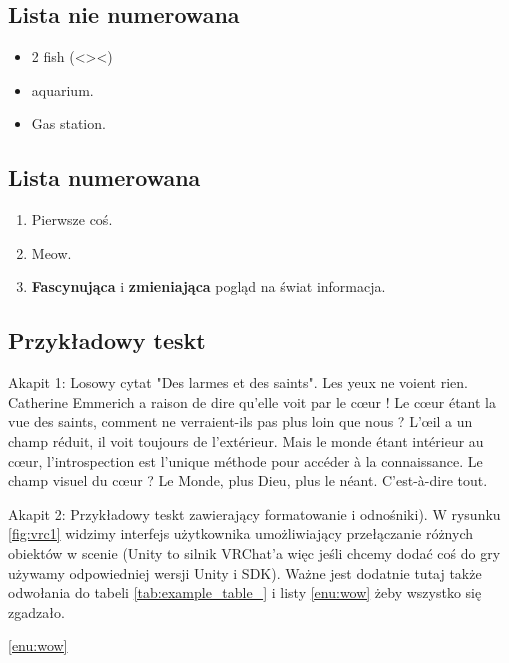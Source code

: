 
\subsection{Lista nie numerowana}
\begin{itemize}
    \item 2 fish (<><)
    \item aquarium.
    \item Gas station.
\end{itemize}
\subsection{Lista numerowana}
\begin{enumerate}
    \item Pierwsze coś.
    \item Meow.
    \item \textbf{Fascynująca} i \textbf{zmieniająca} pogląd na świat informacja. \label{enu:wow}
\end{enumerate}


\subsection*{ Przykładowy teskt }
\begingroup
\raggedright 
Akapit 1: Losowy cytat "Des larmes et des saints".
Les yeux ne voient rien. Catherine Emmerich a raison de dire qu’elle voit
par le cœur ! Le cœur étant la vue des saints, comment ne verraient-ils pas
plus loin que nous ? L’œil a un champ réduit, il voit toujours de l’extérieur.
Mais le monde étant intérieur au cœur, l’introspection est l’unique méthode
pour accéder à la connaissance. Le champ visuel du cœur ? Le Monde, plus
Dieu, plus le néant. C’est-à-dire tout.

Akapit 2: Przykładowy teskt zawierający formatowanie i odnośniki).
W rysunku \ref{fig:vrc1} widzimy interfejs użytkownika umożliwiający przełączanie różnych obiektów w scenie (Unity to silnik VRChat'a więc jeśli chcemy dodać coś do gry używamy odpowiedniej wersji Unity i SDK). Ważne jest dodatnie tutaj także odwołania do tabeli \ref{tab:example_table_} i listy \ref{enu:wow} żeby wszystko się zgadzało.
\begingroup

\ref{enu:wow}